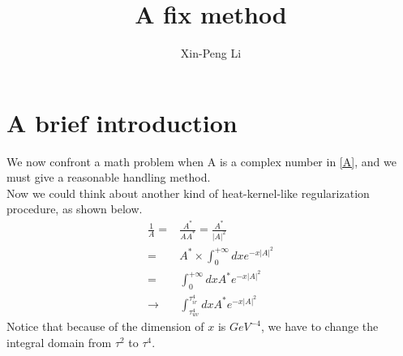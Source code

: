 \documentclass{article}
\title{A fix method}
\author{Xin-Peng Li}
\begin{document}
\maketitle
\section{A brief introduction}
We now confront a math problem when A is a complex number in \autoref{A}, and we must give a reasonable handling method.\\
Now we could think about another kind of heat-kernel-like regularization procedure, as shown below.
\begin{equation}
    \begin{split}
        \frac{1}{A}=&\frac{A^*}{AA^*}=\frac{A^*}{|A|^2}\\
        =&A^*\times \int_{0}^{+\infty}dx e^{-x|A|^2}\\
        =&\int_{0}^{+\infty}dxA^* e^{-x|A|^2}\\
        \rightarrow &\int_{\tau_{uv}^4}^{\tau_{ir}^4}dxA^* e^{-x|A|^2}
    \end{split}
\end{equation}
Notice that because of the dimension of $x$ is $GeV^{-4}$, we have to change the integral domain from $\tau^2$ to $\tau^4$.
\end{document}
